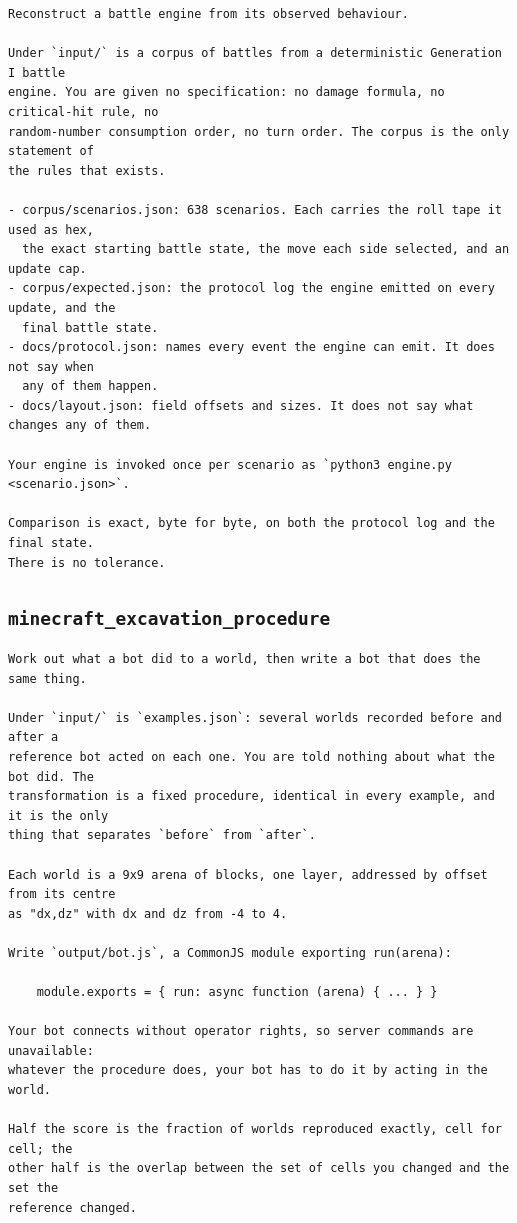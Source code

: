 \documentclass[11pt,a4paper]{article}
\newcommand{\task}[1]{\texttt{#1}}
\begin{document}
\begin{lstlisting}
Reconstruct a battle engine from its observed behaviour.

Under `input/` is a corpus of battles from a deterministic Generation I battle
engine. You are given no specification: no damage formula, no critical-hit rule, no
random-number consumption order, no turn order. The corpus is the only statement of
the rules that exists.

- corpus/scenarios.json: 638 scenarios. Each carries the roll tape it used as hex,
  the exact starting battle state, the move each side selected, and an update cap.
- corpus/expected.json: the protocol log the engine emitted on every update, and the
  final battle state.
- docs/protocol.json: names every event the engine can emit. It does not say when
  any of them happen.
- docs/layout.json: field offsets and sizes. It does not say what changes any of them.

Your engine is invoked once per scenario as `python3 engine.py <scenario.json>`.

Comparison is exact, byte for byte, on both the protocol log and the final state.
There is no tolerance.
\end{lstlisting}

\subsection{\task{minecraft\_excavation\_procedure}}

\begin{lstlisting}
Work out what a bot did to a world, then write a bot that does the same thing.

Under `input/` is `examples.json`: several worlds recorded before and after a
reference bot acted on each one. You are told nothing about what the bot did. The
transformation is a fixed procedure, identical in every example, and it is the only
thing that separates `before` from `after`.

Each world is a 9x9 arena of blocks, one layer, addressed by offset from its centre
as "dx,dz" with dx and dz from -4 to 4.

Write `output/bot.js`, a CommonJS module exporting run(arena):

    module.exports = { run: async function (arena) { ... } }

Your bot connects without operator rights, so server commands are unavailable:
whatever the procedure does, your bot has to do it by acting in the world.

Half the score is the fraction of worlds reproduced exactly, cell for cell; the
other half is the overlap between the set of cells you changed and the set the
reference changed.
\end{lstlisting}
\end{document}
